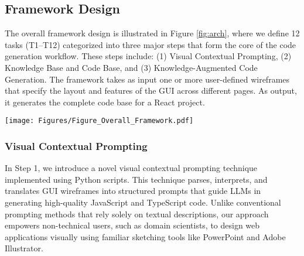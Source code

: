 \subsection{Framework Design}
\label{subsec:frameworkDesign}
The overall framework design is illustrated in Figure \ref{fig:arch}, where we define 12 tasks (T1–T12) categorized into three major steps that form the core of the code generation workflow. These steps include: (1) Visual Contextual Prompting, (2) Knowledge Base and Code Base, and (3) Knowledge-Augmented Code Generation. The framework takes as input one or more user-defined wireframes that specify the layout and features of the GUI across different pages. As output, it generates the complete code base for a React project.

\begin{figure*}[htbp]
 \centering
\texttt{[image: Figures/Figure\_Overall\_Framework.pdf]}
 \caption{Overall framework architecture.}
 \label{fig:arch}
\end{figure*}

\subsubsection{Visual Contextual Prompting}
\label{subsec:simulations1}
In Step 1, we introduce a novel visual contextual prompting technique implemented using Python scripts. This technique parses, interprets, and translates GUI wireframes into structured prompts that guide LLMs in generating high-quality JavaScript and TypeScript code. Unlike conventional prompting methods that rely solely on textual descriptions, our approach empowers non-technical users, such as domain scientists, to design web applications visually using familiar sketching tools like PowerPoint and Adobe Illustrator.

